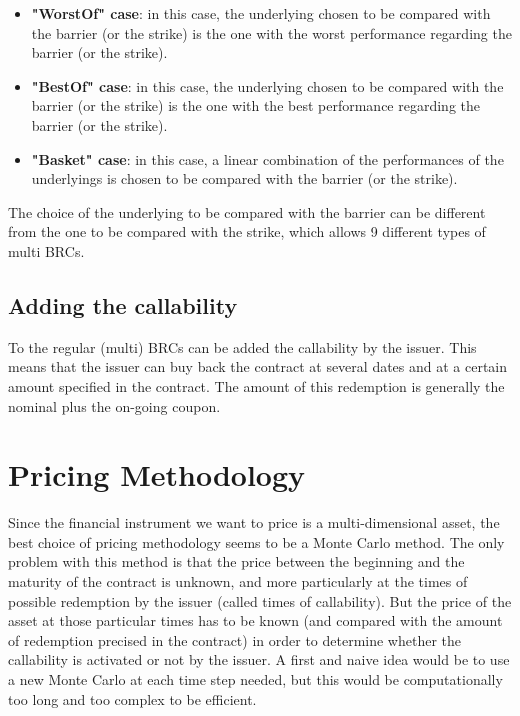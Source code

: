 \documentclass[a4paper,11pt,english]{book}
\begin{document}
\begin{itemize}
    \item \textbf{"WorstOf" case}: in this case, the underlying chosen to be compared with the barrier (or the strike) is the one with the worst performance regarding the barrier (or the strike).
    \item \textbf{"BestOf" case}: in this case, the underlying chosen to be compared with the barrier (or the strike) is the one with the best performance regarding the barrier (or the strike).
    \item \textbf{"Basket" case}: in this case, a linear combination of the performances of the underlyings is chosen to be compared with the barrier (or the strike).
\end{itemize}

The choice of the underlying to be compared with the barrier can be different from the one to be compared with the strike, which allows 9 different types of multi BRCs.

\section{Adding the callability}
To the regular (multi) BRCs can be added the callability by the issuer. This means that the issuer can buy back the contract at several dates and at a certain amount specified in the contract. The amount of this redemption is generally the nominal plus the on-going coupon.


\pagestyle{fancy}

\chapter{Pricing Methodology}
\label{chap:pricing-methodology}
Since the financial instrument we want to price is a multi-dimensional asset, the best choice of pricing methodology seems to be a Monte Carlo method. The only problem with this method is that the price between the beginning and the maturity of the contract is unknown, and more particularly at the times of possible redemption by the issuer (called times of callability). But the price of the asset at those particular times has to be known (and compared with the amount of redemption precised in the contract) in order to determine whether the callability is activated or not by the issuer. A first and naive idea would be to use a new Monte Carlo at each time step needed, but this would be computationally too long and too complex to be efficient.  
\end{document}
